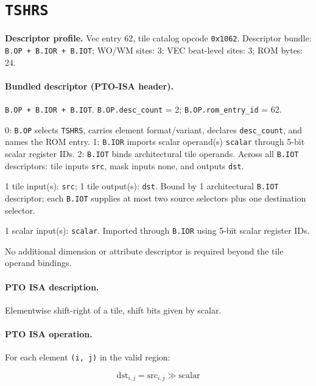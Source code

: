 \section{\texttt{TSHRS}}
\noindent\textbf{Descriptor profile.} Vec entry 62, tile catalog opcode \texttt{0x1062}. Descriptor bundle: \texttt{B.OP + B.IOR + B.IOT}; WO/WM sites: 3; VEC beat-level sites: 3; ROM bytes: 24.\par\smallskip
{}
\paragraph{Bundled descriptor (PTO-ISA header).}
\begin{description}[leftmargin=0.18\linewidth,style=nextline]
\item[Bundle] \texttt{B.OP + B.IOR + B.IOT}. \texttt{B.OP.desc\_count} = 2; \texttt{B.OP.rom\_entry\_id} = 62.
\item[Assembly] 0: \texttt{B.OP} selects \texttt{TSHRS}, carries element format/variant, declares \texttt{desc\_count}, and names the ROM entry. 1: \texttt{B.IOR} imports scalar operand(s) \texttt{scalar} through 5-bit scalar register IDs. 2: \texttt{B.IOT} binds architectural tile operands. Across all \texttt{B.IOT} descriptors: tile inputs \texttt{src}, mask inputs none, and outputs \texttt{dst}.
\item[Tile operands] 1 tile input(s): \texttt{src}; 1 tile output(s): \texttt{dst}. Bound by 1 architectural \texttt{B.IOT} descriptor; each \texttt{B.IOT} supplies at most two source selectors plus one destination selector.
\item[Scalar GPR operands] 1 scalar input(s): \texttt{scalar}. Imported through \texttt{B.IOR} using 5-bit scalar register IDs.
\item[Metadata operands] No additional dimension or attribute descriptor is required beyond the tile operand bindings.
\end{description}
\par\smallskip
{\small
\paragraph{PTO ISA description.}
Elementwise shift-right of a tile, shift bits given by scalar.
\paragraph{PTO ISA operation.}
For each element \texttt{(i, j)} in the valid region:

\[
\mathrm{dst}_{i,j} = \mathrm{src}_{i,j} \gg \mathrm{scalar}
\]
}\par\smallskip
